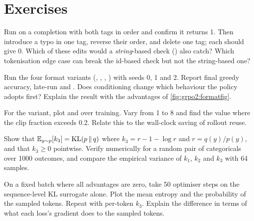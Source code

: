 \section{Exercises}\label{sec:grpo2:exercises}

\begin{exercise}
Run  on a completion with both tags in order and confirm it returns 1.
Then introduce a typo in one tag, reverse their order, and delete one tag; each should give
0. Which of these edits would a \emph{string}-based check () also catch?
Which tokenisation edge case can break the id-based check but not the string-based one?
\end{exercise}

\begin{exercise}
Run the four format variants (, , ,
) with seeds 0, 1 and 2. Report final greedy accuracy, late-run  and . Does
conditioning change which behaviour the policy adopts first? Explain the result with the
advantages of \cref{fig:grpo2:formatfig}.
\end{exercise}

\begin{exercise}
For the  variant, plot  and  over
training. Vary  from 1 to 8 and find the value where the clip fraction
exceeds 0.2. Relate this to the wall-clock saving of rollout reuse.
\end{exercise}

\begin{exercise}[unbiasedness of $k_3$]
Show that $\mathbb{E}_{y\sim p}[k_3]=\operatorname{KL}(p\,\|\,q)$ where $k_3=r-1-\log r$ and $r=q(y)/p(y)$, and
that $k_3\ge0$ pointwise. Verify numerically for a random pair of categoricals over 1000
outcomes, and compare the empirical variance of $k_1$, $k_2$ and $k_3$ with 64 samples.
\end{exercise}

\begin{exercise}
On a fixed batch where all advantages are zero, take 50 optimiser steps on the
sequence-level KL surrogate alone. Plot the mean entropy and the probability of the sampled
tokens. Repeat with per-token $k_3$. Explain the difference in terms of what each loss's
gradient does to the sampled tokens.
\end{exercise}

